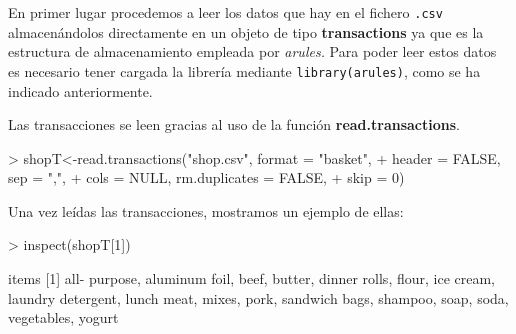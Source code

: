 \documentclass [a4paper] {article}
\begin{document}
{En primer lugar procedemos a leer los datos que hay en el fichero \texttt{.csv} almacenándolos directamente
en un objeto de tipo \textbf{transactions} ya que es la estructura de almacenamiento empleada por \textit{arules.}
Para poder leer estos datos es necesario tener cargada la librería mediante \texttt{library(arules)}, como se ha
indicado anteriormente.

Las transacciones se leen gracias al uso de la función \textbf{read.transactions}.
\begin{Schunk}
\begin{Sinput}
> shopT<-read.transactions("shop.csv", format = "basket", 
+                   header = FALSE, sep = ",", 
+                   cols = NULL, rm.duplicates = FALSE, 
+                   skip = 0)
\end{Sinput}
\end{Schunk}

\bigskip
Una vez leídas las transacciones, mostramos un ejemplo de ellas:
\begin{Schunk}
\begin{Sinput}
> inspect(shopT[1])
\end{Sinput}
\begin{Soutput}
    items              
[1] {all- purpose,     
     aluminum foil,    
     beef,             
     butter,           
     dinner rolls,     
     flour,            
     ice cream,        
     laundry detergent,
     lunch meat,       
     mixes,            
     pork,             
     sandwich bags,    
     shampoo,          
     soap,             
     soda,             
     vegetables,       
     yogurt}           
\end{Soutput}
\end{Schunk}

}
\end{document}
